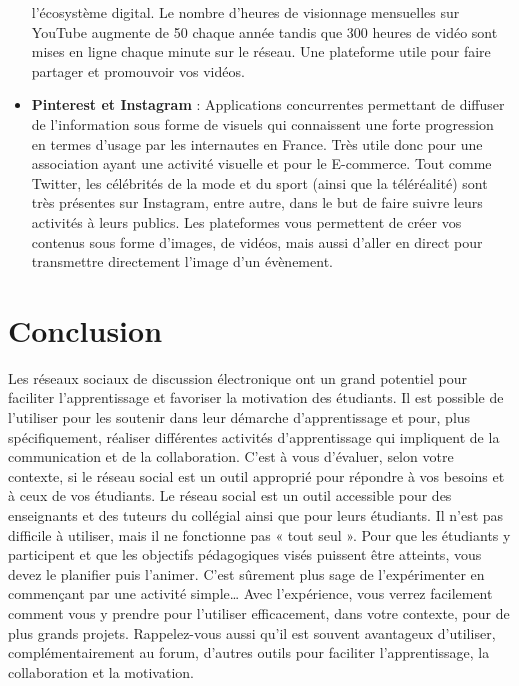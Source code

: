 \documentclass[12pt,a4paper,titlepage]{article}
\begin{document}
\begin{itemize}
l’écosystème digital. Le nombre d’heures de visionnage mensuelles sur YouTube augmente de 50 %
chaque année tandis que 300 heures de vidéo sont mises en ligne chaque minute sur le réseau. Une
plateforme utile pour faire partager et promouvoir vos vidéos.
 \item \textbf{Pinterest et Instagram} : Applications concurrentes permettant de diffuser de l’information sous
forme de visuels qui connaissent une forte progression en termes d’usage par les internautes en France.
Très utile donc pour une association ayant une activité visuelle et pour le E-commerce. Tout comme
Twitter, les célébrités de la mode et du sport (ainsi que la téléréalité) sont très présentes sur Instagram,
entre autre, dans le but de faire suivre leurs activités à leurs publics. Les plateformes vous permettent
de créer vos contenus sous forme d’images, de vidéos, mais aussi d’aller en direct pour transmettre
directement l’image d’un évènement.
\end{itemize}

\section{Conclusion}
Les réseaux sociaux de discussion électronique ont un grand potentiel pour faciliter
l'apprentissage et favoriser la motivation des étudiants. Il est possible de l'utiliser pour les
soutenir dans leur démarche d'apprentissage et pour, plus spécifiquement, réaliser différentes
activités d'apprentissage qui impliquent de la communication et de la collaboration. C'est à vous
d'évaluer, selon votre contexte, si le réseau social est un outil approprié pour répondre à vos
besoins et à ceux de vos étudiants. \newline
Le réseau social est un outil accessible pour des enseignants et des tuteurs du collégial ainsi que
pour leurs étudiants. Il n'est pas difficile à utiliser, mais il ne fonctionne pas « tout seul ». Pour
que les étudiants y participent et que les objectifs pédagogiques visés puissent être atteints, vous
devez le planifier puis l'animer. C'est sûrement plus sage de l'expérimenter en commençant par
une activité simple… Avec l'expérience, vous verrez facilement comment vous y prendre pour
l'utiliser efficacement, dans votre contexte, pour de plus grands projets. Rappelez-vous aussi
qu'il est souvent avantageux d'utiliser, complémentairement au forum, d'autres outils pour
faciliter l'apprentissage, la collaboration et la motivation. \newline
\end{document}

